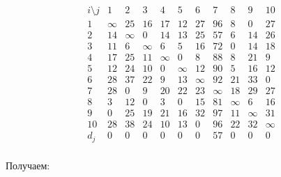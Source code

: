 \documentclass{article}
\begin{document}
\[
    \begin{array}{c|cccccccccc}
        i \setminus j & 1      & 2      & 3      & 4      & 5      & 6      & 7      & 8      & 9      & 10     \\
        \hline
        1             & \infty & 25     & 16     & 17     & 12     & 27     & 96     & 8      & 0      & 27     \\
        2             & 14     & \infty & 0      & 14     & 13     & 25     & 57     & 6      & 14     & 26     \\
        3             & 11     & 6      & \infty & 6      & 5      & 16     & 72     & 0      & 14     & 18     \\
        4             & 17     & 25     & 11     & \infty & 0      & 8      & 88     & 8      & 21     & 9      \\
        5             & 12     & 24     & 10     & 0      & \infty & 12     & 90     & 5      & 16     & 12     \\
        6             & 28     & 37     & 22     & 9      & 13     & \infty & 92     & 21     & 33     & 0      \\
        7             & 28     & 0      & 9      & 20     & 22     & 23     & \infty & 18     & 29     & 27     \\
        8             & 3      & 12     & 0      & 3      & 0      & 15     & 81     & \infty & 6      & 16     \\
        9             & 0      & 25     & 19     & 21     & 16     & 32     & 97     & 11     & \infty & 31     \\
        10            & 28     & 38     & 24     & 10     & 13     & 0      & 96     & 22     & 32     & \infty \\
        \hline
        d_j           & 0      & 0      & 0      & 0      & 0      & 0      & 57     & 0      & 0      & 0      \\
    \end{array}
\]

Получаем:
\end{document}
